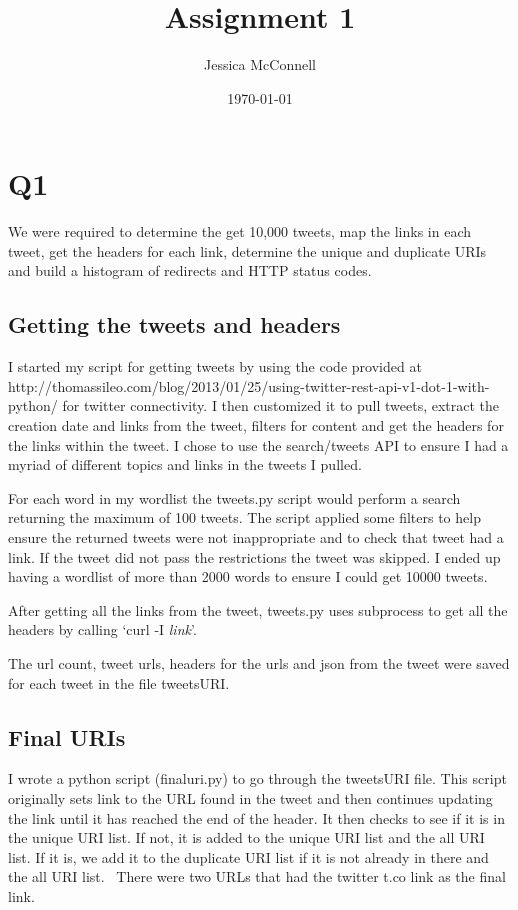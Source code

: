 \documentclass[12pt]{report}
\title{Assignment 1}
\author{Jessica McConnell}
\date{\today}
\begin{document}
\maketitle

\section*{Q1}

We were required to determine the get 10,000 tweets, map the links in each tweet, get the headers for each link, determine the unique and duplicate URIs and build a histogram of redirects and HTTP status codes.

\subsection*{Getting the tweets and headers}

I started my script for getting tweets by using the code provided at http://thomassileo.com/blog/2013/01/25/using-twitter-rest-api-v1-dot-1-with-python/ for twitter connectivity.  I then customized it to pull tweets, extract the creation date and links from the tweet, filters for content and get the headers for the links within the tweet.  I chose to use the search/tweets API to ensure I had a myriad of different topics and links in the tweets I pulled.

For each word in my wordlist the tweets.py script would perform a search returning the maximum of 100 tweets.  The script applied some filters to help ensure the returned tweets were not inappropriate and to check that tweet had a link.  If the tweet did not pass the restrictions the tweet was skipped.  I ended up having a wordlist of more than 2000 words to ensure I could get 10000 tweets.

After getting all the links from the tweet, tweets.py uses subprocess to get all the headers by calling `curl -I \textit{link}'.

The url count, tweet urls, headers for the urls and json from the tweet were saved for each tweet in the file tweetsURI.

\subsection*{Final URIs}

I wrote a python script (finaluri.py) to go through the tweetsURI file.  This script originally sets link to the URL found in the tweet and then continues updating the link until it has reached the end of the header.  It then checks to see if it is in the unique URI list.  If not, it is added to the unique URI list and the all URI list.  If it is, we add it to the duplicate URI list if it is not already in there and the all URI list.
\
There were two URLs that had the twitter t.co link as the final link.
\end{document}

